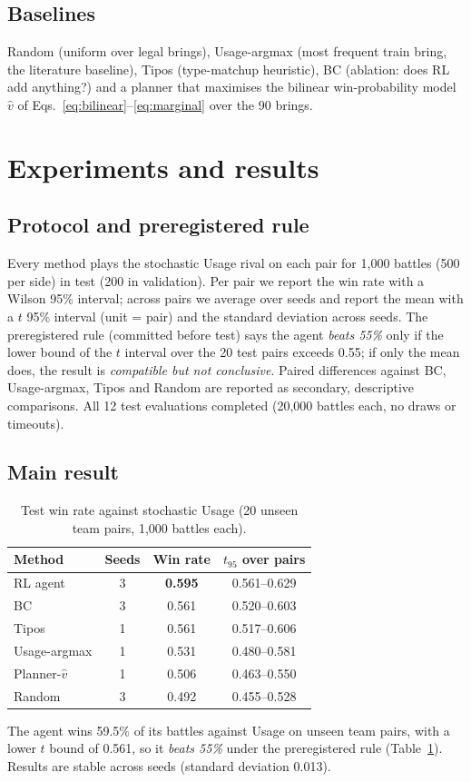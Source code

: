 \subsection{Baselines}
Random (uniform over legal brings), Usage-argmax (most frequent train bring, the literature baseline),
Tipos (type-matchup heuristic), BC (ablation: does RL add anything?) and a planner that maximises the
bilinear win-probability model $\hat v$ of Eqs.~\eqref{eq:bilinear}--\eqref{eq:marginal} over the 90 brings.

\section{Experiments and results}\label{sec:exp}

\subsection{Protocol and preregistered rule}
Every method plays the stochastic Usage rival on each pair for 1{,}000 battles (500 per side) in test
(200 in validation). Per pair we report the win rate with a Wilson 95\% interval; across pairs we average over seeds
and report the mean with a $t$ 95\% interval (unit = pair) and the standard deviation across seeds.
The preregistered rule (committed before test) says the agent \emph{beats 55\%} only if the lower bound of the
$t$ interval over the 20 test pairs exceeds 0.55; if only the mean does, the result is \emph{compatible but not conclusive}.
Paired differences against BC, Usage-argmax, Tipos and Random are reported as secondary, descriptive comparisons.
All 12 test evaluations completed (20{,}000 battles each, no draws or timeouts).

\subsection{Main result}
\begin{table}[t]
\centering
\caption{Test win rate against stochastic Usage (20 unseen team pairs, 1{,}000 battles each).}
\label{tab:test}
\begin{tabular}{lccc}
\hline
Method & Seeds & Win rate & $t_{95}$ over pairs \\
\hline
RL agent & 3 & \textbf{0.595} & 0.561--0.629 \\
BC & 3 & 0.561 & 0.520--0.603 \\
Tipos & 1 & 0.561 & 0.517--0.606 \\
Usage-argmax & 1 & 0.531 & 0.480--0.581 \\
Planner-$\hat v$ & 1 & 0.506 & 0.463--0.550 \\
Random & 3 & 0.492 & 0.455--0.528 \\
\hline
\end{tabular}
\end{table}
The agent wins 59.5\% of its battles against Usage on unseen team pairs, with a lower $t$ bound of 0.561, so it
\emph{beats 55\%} under the preregistered rule (Table~\ref{tab:test}). Results are stable across seeds
(standard deviation 0.013).

